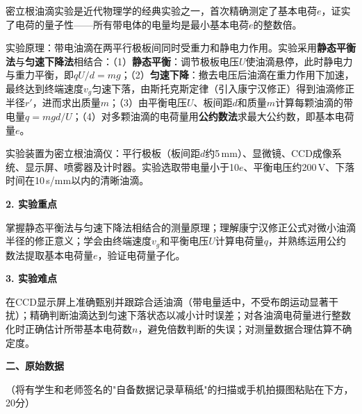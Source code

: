 \documentclass[a4paper,12pt]{article}
\begin{document}
{\fontsize{12pt}{18pt}\selectfont

密立根油滴实验是近代物理学的经典实验之一，首次精确测定了基本电荷$e$，证实了电荷的量子性——所有带电体的电量均是最小基本电荷$e$的整数倍。

实验原理：带电油滴在两平行极板间同时受重力和静电力作用。实验采用\textbf{静态平衡法}与\textbf{匀速下降法}相结合：（1）\textbf{静态平衡}：调节极板电压$U$使油滴悬停，此时静电力与重力平衡，即$qU/d = mg$；（2）\textbf{匀速下降}：撤去电压后油滴在重力作用下加速，最终达到终端速度$v_g$匀速下落，由斯托克斯定律（引入康宁汉修正）得到油滴修正半径$r'$，进而求出质量$m$；（3）由平衡电压$U$、板间距$d$和质量$m$计算每颗油滴的带电量$q = mgd/U$；（4）对多颗油滴的电荷量用\textbf{公约数法}求最大公约数，即基本电荷量$e$。

实验装置为密立根油滴仪：平行极板（板间距$d$约5\,mm）、显微镜、CCD成像系统、显示屏、喷雾器及计时器。实验选取带电量小于10$e$、平衡电压约200\,V、下落时间在10\,s/mm以内的清晰油滴。

}

\vspace{0.5cm}

{\fontsize{14pt}{20pt}\selectfont \textbf{2. 实验重点}}

\vspace{0.3cm}

{\fontsize{12pt}{18pt}\selectfont

掌握静态平衡法与匀速下降法相结合的测量原理；理解康宁汉修正公式对微小油滴半径的修正意义；学会由终端速度$v_g$和平衡电压$U$计算电荷量$q$，并熟练运用公约数法提取基本电荷量$e$，验证电荷量子化。

}

\vspace{0.5cm}

{\fontsize{14pt}{20pt}\selectfont \textbf{3. 实验难点}}

\vspace{0.3cm}

{\fontsize{12pt}{18pt}\selectfont

在CCD显示屏上准确甄别并跟踪合适油滴（带电量适中，不受布朗运动显著干扰）；精确判断油滴达到匀速下落状态以减小计时误差；对各油滴电荷量进行整数化时正确估计所带基本电荷数$n$，避免倍数判断的失误；对测量数据合理估算不确定度。

}

\newpage

{\fontsize{16pt}{24pt}\selectfont \textbf{二、原始数据}}

\vspace{0.3cm}
{\fontsize{12pt}{18pt}\selectfont （将有学生和老师签名的"自备数据记录草稿纸"的扫描或手机拍摄图粘贴在下方，20分）}
\end{document}
